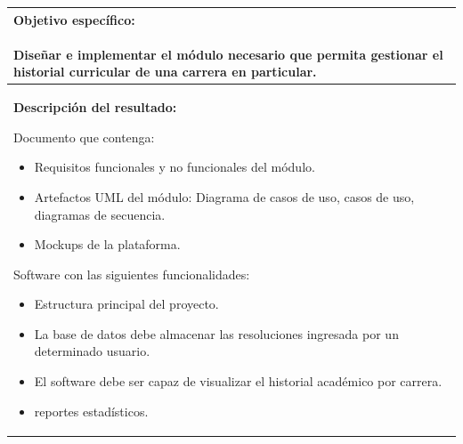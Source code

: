 \documentclass[12pt]{article}
\begin{document}
			 \begin{tabular}{ |p{15cm}|} \hline
				 \parbox[c]{15cm}{ {\bf Objetivo específico:}\\ \\Diseñar e implementar el módulo necesario que permita gestionar el historial curricular de una carrera en particular.\\} 
			\\
			 \hline
				 \parbox[c]{15cm}{ {\bf Descripción del resultado:}\\ 
				 
			Documento que contenga: \\
				 \begin{itemize}
				  \item Requisitos funcionales y no funcionales del módulo.
				  \item Artefactos UML del módulo: Diagrama de casos de uso, casos de uso, diagramas de secuencia.
				  \item Mockups de la plataforma.
				
				 \end{itemize}
			Software con las siguientes funcionalidades:\\
			      \begin{itemize}
							\item Estructura principal del proyecto.
							\item La base de datos debe almacenar las resoluciones ingresada por un determinado usuario.
			       \item El software debe ser capaz de visualizar el historial académico por carrera.
			       \item reportes estadísticos.
			     
			      \end{itemize}

				 
				 
				 } 
			 \\ \hline			 
			 \end{tabular}	
			 \\ \\  \\ 
			 
\end{document}
